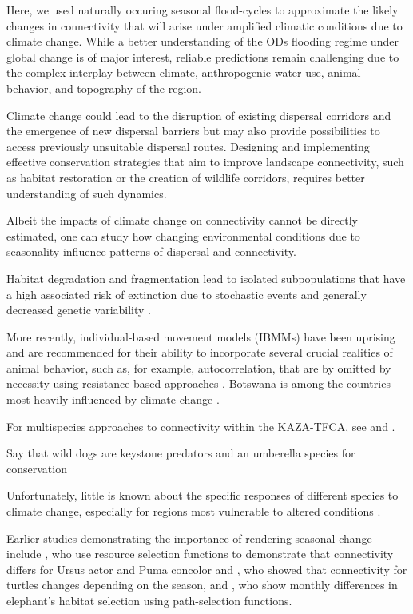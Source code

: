 \documentclass[abstract=on,10pt,a4paper,bibliography=totocnumbered]{article}
\begin{document}
Here, we used naturally occuring seasonal flood-cycles to approximate the likely
changes in connectivity that will arise under amplified climatic conditions due
to climate change. While a better understanding of the ODs flooding regime under
global change is of major interest, reliable predictions remain challenging due
to the complex interplay between climate, anthropogenic water use, animal
behavior, and topography of the region.

Climate change
could lead to the disruption of existing dispersal corridors and the emergence
of new dispersal barriers but may also provide possibilities to access
previously unsuitable dispersal routes. Designing and implementing effective
conservation strategies that aim to improve landscape connectivity, such as
habitat restoration or the creation of wildlife corridors, requires better
understanding of such dynamics.

Albeit the impacts of climate change on connectivity cannot be directly
estimated, one can study how changing environmental conditions due to
seasonality influence patterns of dispersal and connectivity.

Habitat degradation and fragmentation lead to isolated subpopulations that have
a high associated risk of extinction due to stochastic events and generally
decreased genetic variability \citep{Melbourne.2008}.

More recently, individual-based movement models (IBMMs) have been uprising and
are recommended for their ability to incorporate several crucial realities of
animal behavior, such as, for example, autocorrelation, that are by omitted by
necessity using resistance-based approaches \citep{Hofmann.2023,
Unnithan.2022a}.
Botswana is among the countries most heavily influenced by climate change .

For multispecies approaches to connectivity within the KAZA-TFCA, see
\cite{Brennan.2020} and \cite{Lines.2021}.




Say that wild dogs are keystone predators and an umberella species for
conservation

Unfortunately, little is known about the specific responses of different species
to climate change, especially for regions most vulnerable to altered conditions
\citep{Paniw.2021}.

Earlier studies demonstrating the importance of rendering seasonal change
include \cite{Chetkiewicz.2009}, who use resource selection functions to demonstrate
that connectivity differs for Ursus actor and Puma concolor and \cite{Mui.2017},
who showed that connectivity for turtles changes depending on the season, and
\cite{Kaszta.2021}, who show monthly differences in elephant's habitat selection
using path-selection functions.
\end{document}
